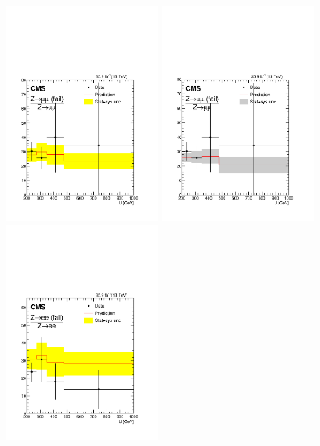 \begin{figure}
\centering
\includegraphics[width=0.45\textwidth]{figures/pullsImpact/ratio_zmm_fail_zmm_shapes_prefit.pdf}
\includegraphics[width=0.45\textwidth]{figures/pullsImpact/ratio_zmm_fail_zmm_shapes_fit_b.pdf}\\
\includegraphics[width=0.45\textwidth]{figures/pullsImpact/ratio_zee_fail_zee_shapes_prefit.pdf}

\end{figure}
